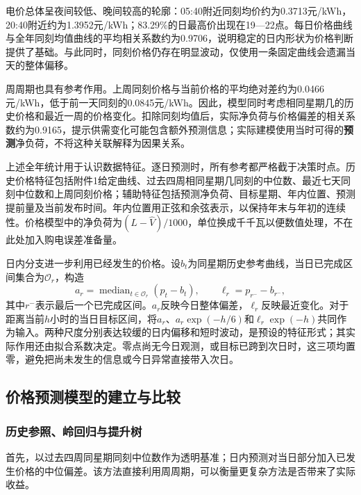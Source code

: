 \documentclass[11pt,a4paper]{article}
\begin{document}
电价总体呈夜间较低、晚间较高的轮廓：05:40附近同刻均价约为0.3713元/kWh，20:40附近约为1.3952元/kWh；83.29\%的日最高价出现在19—22点。每日价格曲线与全年同刻均值曲线的平均相关系数约为0.9706，说明稳定的日内形状为价格判断提供了基础。与此同时，同刻价格仍存在明显波动，仅使用一条固定曲线会遗漏当天的整体偏移。

周周期也具有参考作用。上周同刻价格与当前价格的平均绝对差约为0.0466元/kWh，低于前一天同刻的0.0845元/kWh。因此，模型同时考虑相同星期几的历史价格和最近一周的价格变化。扣除同刻均值后，实际净负荷与价格偏差的相关系数约为0.9165，提示供需变化可能包含额外预测信息；实际建模使用当时可得的\textbf{预测}净负荷，不将这种关联解释为因果关系。

上述全年统计用于认识数据特征。逐日预测时，所有参考都严格截于决策时点。历史价格特征包括附件1给定曲线、过去四周相同星期几同刻的中位数、最近七天同刻中位数和上周同刻价格；辅助特征包括预测净负荷、目标星期、年内位置、预测提前量及当前发布时间。年内位置用正弦和余弦表示，以保持年末与年初的连续性。价格模型中的净负荷为$(\widehat L-\widehat V)/1000$，单位换成千千瓦以便数值处理，不在此处加入购电误差准备量。

日内分支进一步利用已经发生的价格。设$b_t$为同星期历史参考曲线，当日已完成区间集合为$\mathcal O_r$，构造
\begin{equation}
 a_r=\operatorname{median}_{t\in\mathcal O_r}(p_t-b_t),\qquad
 \ell_r=p_{r^-}-b_{r^-},
\end{equation}
其中$r^-$表示最后一个已完成区间。$a_r$反映今日整体偏差，$\ell_r$反映最近变化。对于距离当前$h$小时的当日目标区间，将$a_r$、$a_r\exp(-h/6)$和$\ell_r\exp(-h)$共同作为输入。两种尺度分别表达较缓的日内偏移和短时波动，是预设的特征形式；其实际作用还由拟合系数决定。零点尚无今日观测，或目标已跨到次日时，这三项均置零，避免把尚未发生的信息或今日异常直接带入次日。

\subsection{价格预测模型的建立与比较}

\subsubsection{历史参照、岭回归与提升树}

首先，以过去四周同星期同刻中位数作为透明基准；日内预测对当日部分加入已发生价格的中位偏差。该方法直接利用周周期，可以衡量更复杂方法是否带来了实际收益。
\end{document}
